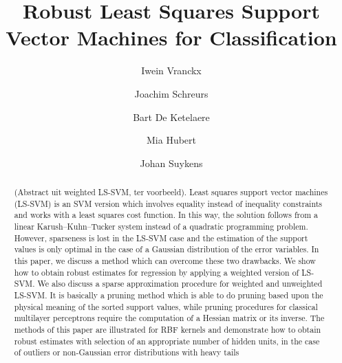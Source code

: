 \documentclass[preprint,12pt]{elsarticle}
\begin{document}
\begin{frontmatter}


\title{Robust Least Squares Support Vector Machines for Classification}





\author[statistics]{Iwein Vranckx}

\author[stadius]{Joachim Schreurs}
\author[mebios]{Bart De Ketelaere}
\author[statistics]{Mia Hubert}
\author[stadius]{Johan Suykens}
%
\address[statistics]{KU Leuven, Department of Mathematics and LStat, Celestijnenlaan 200B, BE-3001 Heverlee, Belgium}
\address[stadius]{KU Leuven, ESAT-STADIUS, Kasteelpark Arenberg 10, BE-3001 Heverlee, Belgium}
\address[mebios]{KU Leuven, Division of Mechatronics, Biostatistics and Sensors, Kasteelpark Arenberg 30, BE-3001 Heverlee, Belgium}

\begin{abstract}
(Abstract uit weighted LS-SVM, ter voorbeeld). Least squares support vector machines (LS-SVM) is an SVM version which involves
equality instead of inequality constraints and works with a least squares cost function.
In this way, the solution follows from a linear Karush–Kuhn–Tucker system instead of
a quadratic programming problem. However, sparseness is lost in the LS-SVM case and
the estimation of the support values is only optimal in the case of a Gaussian distribution
of the error variables. In this paper, we discuss a method which can overcome these two
drawbacks. We show how to obtain robust estimates for regression by applying a weighted
version of LS-SVM. We also discuss a sparse approximation procedure for weighted and
unweighted LS-SVM. It is basically a pruning method which is able to do pruning based
upon the physical meaning of the sorted support values, while pruning procedures for
classical multilayer perceptrons require the computation of a Hessian matrix or its inverse.
The methods of this paper are illustrated for RBF kernels and demonstrate how to obtain
robust estimates with selection of an appropriate number of hidden units, in the case of
outliers or non-Gaussian error distributions with heavy tails


\end{abstract}
\end{frontmatter}
\end{document}
